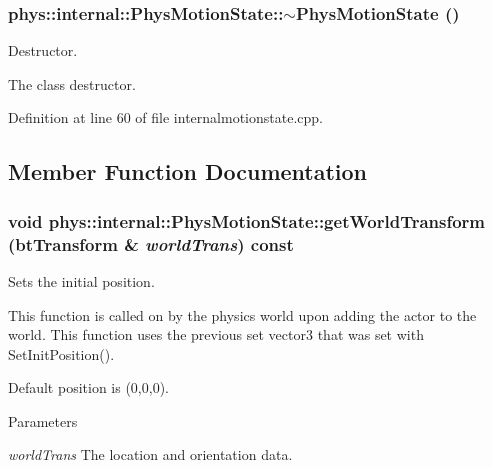 \hypertarget{classphys_1_1internal_1_1PhysMotionState_a46f94854cc2d758a2adae412dea6def7}{
\subsubsection[{$\sim$PhysMotionState}]{\setlength{\rightskip}{0pt plus 5cm}phys::internal::PhysMotionState::$\sim$PhysMotionState ()}}
\label{dc/df8/classphys_1_1internal_1_1PhysMotionState_a46f94854cc2d758a2adae412dea6def7}


Destructor. 

The class destructor. 

Definition at line 60 of file internalmotionstate.cpp.



\subsection{Member Function Documentation}
\hypertarget{classphys_1_1internal_1_1PhysMotionState_a8daeae588d49f07da6c6dfec83de45c3}{
\subsubsection[{getWorldTransform}]{\setlength{\rightskip}{0pt plus 5cm}void phys::internal::PhysMotionState::getWorldTransform (btTransform \& {\em worldTrans}) const}}
\label{dc/df8/classphys_1_1internal_1_1PhysMotionState_a8daeae588d49f07da6c6dfec83de45c3}


Sets the initial position. 

This function is called on by the physics world upon adding the actor to the world. This function uses the previous set vector3 that was set with SetInitPosition(). \par
 Default position is (0,0,0). 
\begin{DoxyParams}{Parameters}
\item[{\em worldTrans}]The location and orientation data. \end{DoxyParams}


